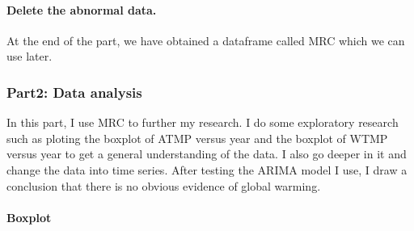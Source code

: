 \documentclass[]{article}
\newenvironment{Shaded}{\begin{snugshade}}{\end{snugshade}}
\newcommand{\CommentTok}[1]{\textcolor[rgb]{0.56,0.35,0.01}{\textit{#1}}}
\newcommand{\DataTypeTok}[1]{\textcolor[rgb]{0.13,0.29,0.53}{#1}}
\newcommand{\DecValTok}[1]{\textcolor[rgb]{0.00,0.00,0.81}{#1}}
\newcommand{\FloatTok}[1]{\textcolor[rgb]{0.00,0.00,0.81}{#1}}
\newcommand{\KeywordTok}[1]{\textcolor[rgb]{0.13,0.29,0.53}{\textbf{#1}}}
\newcommand{\NormalTok}[1]{#1}
\newcommand{\OperatorTok}[1]{\textcolor[rgb]{0.81,0.36,0.00}{\textbf{#1}}}
\newcommand{\OtherTok}[1]{\textcolor[rgb]{0.56,0.35,0.01}{#1}}
\newcommand{\StringTok}[1]{\textcolor[rgb]{0.31,0.60,0.02}{#1}}
\let\oldparagraph\paragraph
\renewcommand{\paragraph}[1]{\oldparagraph{#1}\mbox{}}
\begin{document}
\hypertarget{delete-the-abnormal-data.}{%
\paragraph{Delete the abnormal data.}\label{delete-the-abnormal-data.}}

\begin{Shaded}
\end{Shaded}

At the end of the part, we have obtained a dataframe called MRC which we
can use later.

\hypertarget{part2-data-analysis}{%
\subsubsection{Part2: Data analysis}\label{part2-data-analysis}}

In this part, I use MRC to further my research. I do some exploratory
research such as ploting the boxplot of ATMP versus year and the boxplot
of WTMP versus year to get a general understanding of the data. I also
go deeper in it and change the data into time series. After testing the
ARIMA model I use, I draw a conclusion that there is no obvious evidence
of global warming.

\hypertarget{boxplot}{%
\paragraph{Boxplot}\label{boxplot}}

\begin{Shaded}
\end{Shaded}
\end{document}
